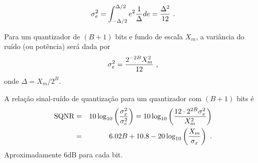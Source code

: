 \begin{frame}[allowframebreaks]
  \begin{equation}
  \sigma_e^2 = \int_{-\Delta/2}^{\Delta/2} e^2 \frac{1}{\Delta} de = \frac{\Delta^2}{12} \textmd{ .}
  \end{equation}

  Para um quantizador de $(B+1)$ bits e fundo de escala $X_m$, a variância do ruído (ou potência)
  será dada por
  \begin{equation}
  \sigma_e^2 = \frac{2^{-2B}X_m^2}{12} \textmd{ ,}
  \end{equation}
  onde $\Delta = X_m/2^B$.


  \framebreak

  A relação sinal-ruído de quantização para um quantizador com $(B+1)$ bits é
  \begin{eqnarray}
  \textmd{SQNR} &=& 10 \log_{10} \left( \frac{\sigma_x^2}{\sigma_e^2} \right) = 10 \log_{10} \left( \frac{12 \cdot 2^{2B} \sigma_x^2}{X_m^2} \right) \nonumber \\
      &=& 6.02 B + 10.8 - 20 \log_{10} \left( \frac{X_m}{\sigma_x} \right) \textmd{ .}
  \end{eqnarray}
  Aproximadamente 6dB para cada bit.

\end{frame} 


